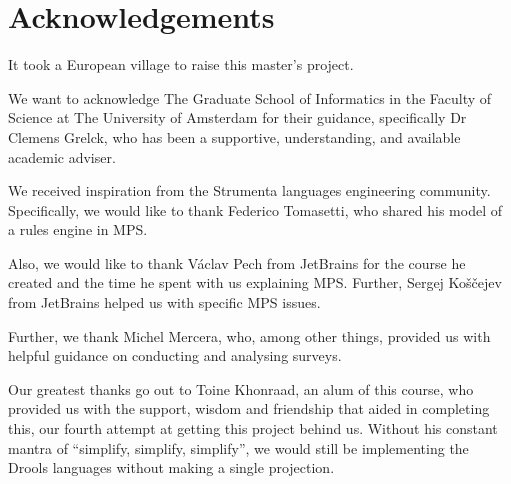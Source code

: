 \chapter*{Acknowledgements}

It took a European village to raise this master's project.


We want to acknowledge The Graduate School of Informatics in the Faculty of Science at The University of Amsterdam for their guidance, specifically Dr Clemens Grelck, who has been a supportive, understanding, and available academic adviser.


We received inspiration from the Strumenta languages engineering community.
Specifically, we would like to thank Federico Tomasetti, who shared his model of a rules engine in MPS.


Also, we would like to thank Václav Pech from JetBrains for the course he created and the time he spent with us explaining MPS.
Further, Sergej Koščejev from JetBrains helped us with specific MPS issues.


Further, we thank Michel Mercera, who, among other things, provided us with helpful guidance on conducting and analysing surveys.


Our greatest thanks go out to Toine Khonraad, an alum of this course, who provided us with the support, wisdom and friendship that aided in completing this, our fourth attempt at getting this project behind us.
Without his constant mantra of ``simplify, simplify, simplify'', we would still be implementing the Drools languages without making a single projection.
